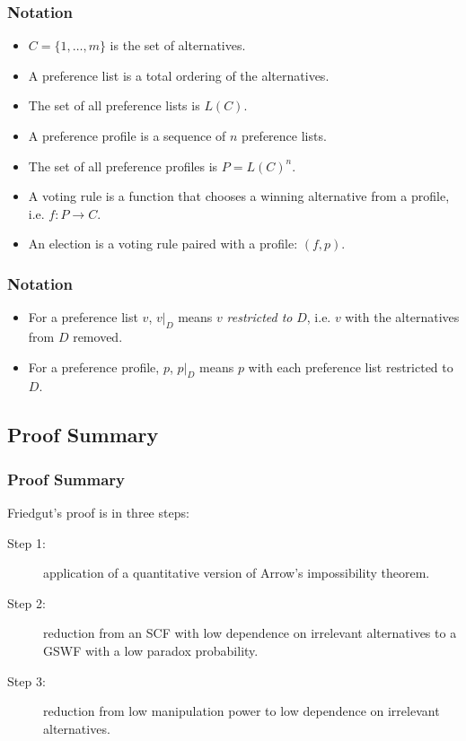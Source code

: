 \documentclass[aspectratio=169]{beamer}
\begin{document}
		\begin{frame}
			\frametitle{Notation}
			\begin{itemize}
				\item $C = \{1, \ldots, m\}$ is the set of alternatives.
				\item A preference list is a total ordering of the alternatives.
				\item The set of all preference lists is $L(C)$.
				\item A preference profile is a sequence of $n$ preference lists.
				\item The set of all preference profiles is $P = L(C)^n$.
				\item A voting rule is a function that chooses a winning alternative from a profile, i.e. $f : P \to C$.
				\item An election is a voting rule paired with a profile: $(f, p)$.
			\end{itemize}

		\end{frame}

		\begin{frame}
			\frametitle{Notation}
			\begin{itemize}
				\item For a preference list $v$, $v|_D$ means $v$ \emph{restricted to} $D$, i.e. $v$ with the alternatives from $D$ removed.
				\item For a preference profile, $p$, $p|_D$ means $p$ with each preference list restricted to $D$.
			\end{itemize}
		\end{frame}


	\subsection{Proof Summary}

		\begin{frame}
			\frametitle{Proof Summary}
			Friedgut's proof is in three steps:
			\begin{description}
				\item[Step 1:] application of a quantitative version of Arrow's impossibility theorem.
				\item[Step 2:] reduction from an SCF with low dependence on irrelevant alternatives to a GSWF with a low paradox probability.
				\item[Step 3:] reduction from low manipulation power to low dependence on irrelevant alternatives.
			\end{description}
		\end{frame}
\end{document}
